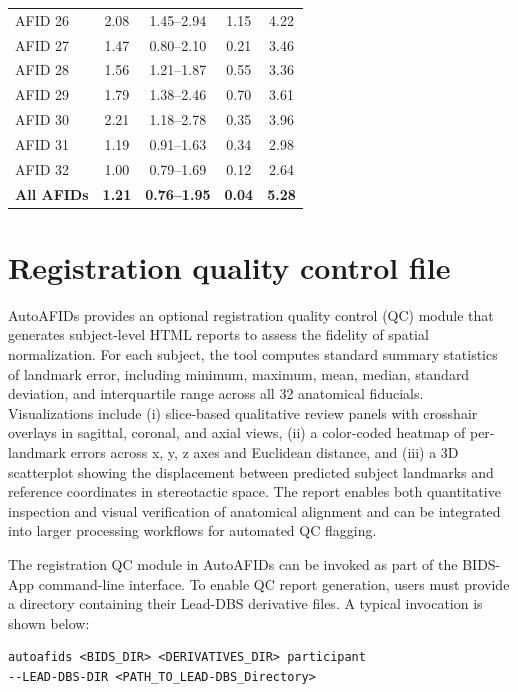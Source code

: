 \begin{table}[H]
\begin{tabular}{lcccc}
AFID 26 & 2.08 & 1.45--2.94 & 1.15 & 4.22 \\
AFID 27 & 1.47 & 0.80--2.10 & 0.21 & 3.46 \\
AFID 28 & 1.56 & 1.21--1.87 & 0.55 & 3.36 \\
AFID 29 & 1.79 & 1.38--2.46 & 0.70 & 3.61 \\
AFID 30 & 2.21 & 1.18--2.78 & 0.35 & 3.96 \\
AFID 31 & 1.19 & 0.91--1.63 & 0.34 & 2.98 \\
AFID 32 & 1.00 & 0.79--1.69 & 0.12 & 2.64 \\
\midrule
\textbf{All AFIDs} & \textbf{1.21} & \textbf{0.76--1.95} & \textbf{0.04} & \textbf{5.28} \\
\bottomrule
\end{tabular}
\end{table}

\newpage
\section{Registration quality control file}
AutoAFIDs provides an optional registration quality control (QC) module that generates subject-level HTML reports to assess the fidelity of spatial normalization. For each subject, the tool computes standard summary statistics of landmark error, including minimum, maximum, mean, median, standard deviation, and interquartile range across all 32 anatomical fiducials. Visualizations include (i) slice-based qualitative review panels with crosshair overlays in sagittal, coronal, and axial views, (ii) a color-coded heatmap of per-landmark errors across x, y, z axes and Euclidean distance, and (iii) a 3D scatterplot showing the displacement between predicted subject landmarks and reference coordinates in stereotactic space. The report enables both quantitative inspection and visual verification of anatomical alignment and can be integrated into larger processing workflows for automated QC flagging.

The registration QC module in AutoAFIDs can be invoked as part of the BIDS-App command-line interface. To enable QC report generation, users must provide a directory containing their Lead-DBS derivative files. A typical invocation is shown below:

\begin{verbatim}
autoafids <BIDS_DIR> <DERIVATIVES_DIR> participant
--LEAD-DBS-DIR <PATH_TO_LEAD-DBS_Directory>
\end{verbatim}

